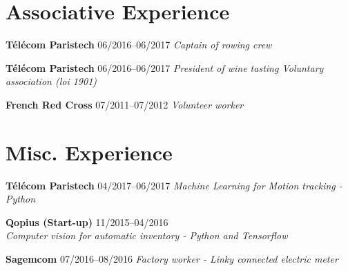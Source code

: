 \documentclass[]{source}
\begin{document}
\begin{multicols}{2}
\section{Associative Experience}

 \textbf{Télécom Paristech} \hfill 06/2016–06/2017\newline
\textit{Captain of rowing crew}

\medskip

 \textbf{Télécom Paristech} \hfill  06/2016–06/2017 \newline
\textit{President of wine tasting Voluntary  \newline association (loi 1901)}

\medskip

 \textbf{French Red Cross} \hfill  07/2011–07/2012\newline
\textit{Volunteer worker}

\vspace{3cm}

\section{Misc. Experience}

 \textbf{Télécom Paristech} \hfill  04/2017–06/2017\newline
\textit{Machine Learning for Motion \newline tracking - Python}

\medskip

 \textbf{Qopius (Start-up)} \hfill  11/2015–04/2016\\
\textit{Computer vision for automatic  \newline inventory - Python and Tensorflow}

\medskip

 \textbf{Sagemcom}  \hfill 07/2016–08/2016\newline
\textit{Factory worker - Linky connected  \newline electric meter}

\end{multicols}
\end{document}
